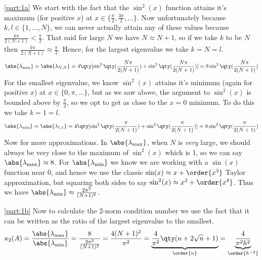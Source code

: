 \documentclass[boxes,pages]{homework}
\begin{document}
\begin{solution}
	\ref{part:1a}
	We start with the fact that the $\sin^2(x)$ function attains it's maximum (for positive $x$) at $x\in\{\frac{\pi}{2}, \frac{3\pi}{2},\ldots\}$. Now unfortunately because $k,l\in\{1,\ldots, N\}$, we can never actually attain any of these values because $\frac{k\pi}{2(N+1)} < \frac{\pi}{2}$. That said for large $N$ we have $N\approx N + 1$, so if we take $k$ to be $N$ then $\frac{k\pi}{2(N+1)} \approx \frac{\pi}{2}$. Hence, for the largest eigenvalue we take $k = N = l$.
	\begin{equation*}
		\abs{\lambda_\text{max}} = \abs{\lambda_{N, N}} = 4\qty[\sin^2\qty(\frac{N\pi}{2(N+1)}) + \sin^2\qty(\frac{N\pi}{2(N+1)})] = 8\sin^2\qty(\frac{N\pi}{2(N+1)})
	\end{equation*}
	For the smallest eigenvalue, we know $\sin^2(x)$ attains it's minimum (again for positive $x$) at $x\in\{0, \pi,\ldots\}$, but as we saw above, the argument to $\sin^2(x)$ is bounded above by $\frac{\pi}{2}$, so we opt to get as close to the $x = 0$ minimum. To do this we take $k = 1 = l$.
	\begin{equation*}
		\abs{\lambda_\text{min}} = \abs{\lambda_{1, 1}} = 4\qty[\sin^2\qty(\frac{\pi}{2(N+1)}) + \sin^2\qty(\frac{\pi}{2(N+1)})] = 8\sin^2\qty(\frac{\pi}{2(N+1)})
	\end{equation*}
	Now for more approximations. In $\abs{\lambda_\text{max}}$, when $N$ is \emph{very} large, we should always be very close to the maximum of $\sin^2(x)$ which is 1, so we can say $\abs{\lambda_\text{max}}\approx 8$. For $\abs{\lambda_\text{min}}$ we know we are working with a $\sin(x)$ function near 0, and hence we use the classic $\sin(x)\approx x + \order{x^3}$ Taylor approximation, but squaring both sides to say $\sin^2(x)\approx x^2 + \order{x^4}$. Thus we have $\abs{\lambda_\text{min}}\approx \frac{2\pi^2}{(N + 1)^2}$.

	\ref{part:1b}
	Now to calculate the 2-norm condition number we use the fact that it can be written as the ratio of the largest eigenvalue to the smallest.
	\begin{equation*}
		\kappa_2(A) = \frac{\abs{\lambda_\text{max}}}{\abs{\lambda_\text{min}}} = \frac{8}{\frac{2\pi^2}{(N + 1)^2}} = \frac{4(N+1)^2}{\pi^2} = \underbrace{\frac{4}{\pi^2}\qty(n + 2\sqrt{n}+ 1)}_{\order{n}} = \underbrace{\frac{4}{\pi^2h^2}}_{\order{h^{-2}}}
	\end{equation*}
\end{solution}
\end{document}
